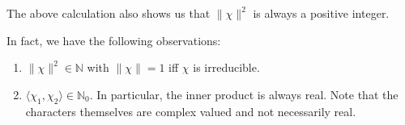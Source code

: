 \begin{rem} \label{rem:normcharacisnatural}
	The above calculation also shows us that $\|\chi\|^{2}$ is always a positive integer.
\end{rem}
\begin{cor} \label{cor:innerprodproperties}
	In fact, we have the following observations:
	\begin{enumerate}
		\item $\|\chi\|^{2} \in \mathbb{N}$ with $\|\chi\| = 1$ iff $\chi$ is irreducible.
		\item $\langle \chi_1, \chi_2\rangle \in \mathbb{N}_0.$ In particular, the inner product is always real. Note that the characters themselves are complex valued and not necessarily real.
	\end{enumerate}
\end{cor}

